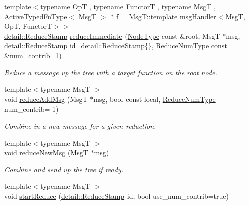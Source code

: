 \begin{DoxyCompactItemize}
{\footnotesize template$<$typename OpT , typename FunctorT , typename MsgT , Active\+Typed\+Fn\+Type$<$ Msg\+T $>$ $\ast$ f = Msg\+T\+::template msg\+Handler$<$\+Msg\+T, Op\+T, Functor\+T$>$$>$ }\\\hyperlink{namespacevt_1_1collective_1_1reduce_1_1detail_aacc1fcd729d934ba143fee3a943bf9e7}{detail\+::\+Reduce\+Stamp} \hyperlink{structvt_1_1collective_1_1reduce_1_1_reduce_a80589266a6fc802458c56cfe8f90679d}{reduce\+Immediate} (\hyperlink{namespacevt_a866da9d0efc19c0a1ce79e9e492f47e2}{Node\+Type} const \&root, MsgT $\ast$msg, \hyperlink{namespacevt_1_1collective_1_1reduce_1_1detail_aacc1fcd729d934ba143fee3a943bf9e7}{detail\+::\+Reduce\+Stamp} id=\hyperlink{namespacevt_1_1collective_1_1reduce_1_1detail_aacc1fcd729d934ba143fee3a943bf9e7}{detail\+::\+Reduce\+Stamp}\{\}, \hyperlink{structvt_1_1collective_1_1reduce_1_1_reduce_a6c3e63aca10c31d2823b0b18cf9762a4}{Reduce\+Num\+Type} const \&num\+\_\+contrib=1)
\begin{DoxyCompactList}\small\item\em \hyperlink{structvt_1_1collective_1_1reduce_1_1_reduce}{Reduce} a message up the tree with a target function on the root node. \end{DoxyCompactList}\item 
{\footnotesize template$<$typename MsgT $>$ }\\void \hyperlink{structvt_1_1collective_1_1reduce_1_1_reduce_a18df32ceadd6b55979c8fd7e85f613e4}{reduce\+Add\+Msg} (MsgT $\ast$msg, bool const local, \hyperlink{structvt_1_1collective_1_1reduce_1_1_reduce_a6c3e63aca10c31d2823b0b18cf9762a4}{Reduce\+Num\+Type} num\+\_\+contrib=-\/1)
\begin{DoxyCompactList}\small\item\em Combine in a new message for a given reduction. \end{DoxyCompactList}\item 
{\footnotesize template$<$typename MsgT $>$ }\\void \hyperlink{structvt_1_1collective_1_1reduce_1_1_reduce_a0642df1a1e52d7da269d8fb23dfc193f}{reduce\+New\+Msg} (MsgT $\ast$msg)
\begin{DoxyCompactList}\small\item\em Combine and send up the tree if ready. \end{DoxyCompactList}\item 
{\footnotesize template$<$typename MsgT $>$ }\\void \hyperlink{structvt_1_1collective_1_1reduce_1_1_reduce_ad8849fa013a4b3e3f795ceeb103026e4}{start\+Reduce} (\hyperlink{namespacevt_1_1collective_1_1reduce_1_1detail_aacc1fcd729d934ba143fee3a943bf9e7}{detail\+::\+Reduce\+Stamp} id, bool use\+\_\+num\+\_\+contrib=true)

\end{DoxyCompactItemize}
